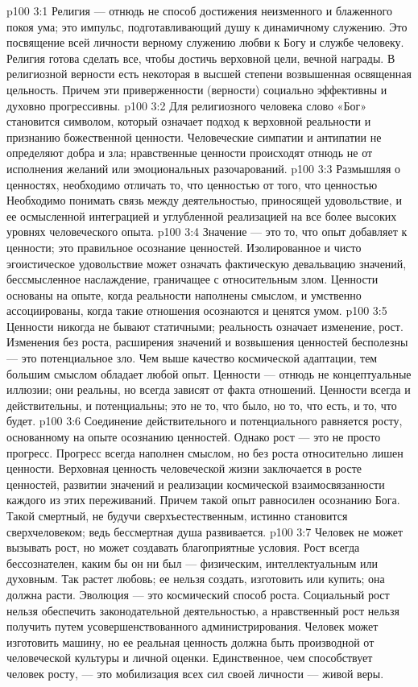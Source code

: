 \vs p100 3:1 Религия --- отнюдь не способ достижения неизменного и блаженного покоя ума; это импульс, подготавливающий душу к динамичному служению. Это посвящение всей личности верному служению любви к Богу и службе человеку. Религия готова сделать все, чтобы достичь верховной цели, вечной награды. В религиозной верности есть некоторая в высшей степени возвышенная освященная цельность. Причем эти приверженности (верности) социально эффективны и духовно прогрессивны.
\vs p100 3:2 Для религиозного человека слово «Бог» становится символом, который означает подход к верховной реальности и признанию божественной ценности. Человеческие симпатии и антипатии не определяют добра и зла; нравственные ценности происходят отнюдь не от исполнения желаний или эмоциональных разочарований.
\vs p100 3:3 Размышляя о ценностях, необходимо отличать то, что ценностью  от того, что ценностью  Необходимо понимать связь между деятельностью, приносящей удовольствие, и ее осмысленной интеграцией и углубленной реализацией на все более высоких уровнях человеческого опыта.
\vs p100 3:4 \pc Значение --- это то, что опыт добавляет к ценности; это правильное осознание ценностей. Изолированное и чисто эгоистическое удовольствие может означать фактическую девальвацию значений, бессмысленное наслаждение, граничащее с относительным злом. Ценности основаны на опыте, когда реальности наполнены смыслом, и умственно ассоциированы, когда такие отношения осознаются и ценятся умом.
\vs p100 3:5 \pc Ценности никогда не бывают статичными; реальность означает изменение, рост. Изменения без роста, расширения значений и возвышения ценностей бесполезны --- это потенциальное зло. Чем выше качество космической адаптации, тем большим смыслом обладает любой опыт. Ценности --- отнюдь не концептуальные иллюзии; они реальны, но всегда зависят от факта отношений. Ценности всегда и действительны, и потенциальны; это не то, что было, но то, что есть, и то, что будет.
\vs p100 3:6 Соединение действительного и потенциального равняется росту, основанному на опыте осознанию ценностей. Однако рост --- это не просто прогресс. Прогресс всегда наполнен смыслом, но без роста относительно лишен ценности. Верховная ценность человеческой жизни заключается в росте ценностей, развитии значений и реализации космической взаимосвязанности каждого из этих переживаний. Причем такой опыт равносилен осознанию Бога. Такой смертный, не будучи сверхъестественным, истинно становится сверхчеловеком; ведь бессмертная душа развивается.
\vs p100 3:7 Человек не может вызывать рост, но может создавать благоприятные условия. Рост всегда бессознателен, каким бы он ни был --- физическим, интеллектуальным или духовным. Так растет любовь; ее нельзя создать, изготовить или купить; она должна расти. Эволюция --- это космический способ роста. Социальный рост нельзя обеспечить законодательной деятельностью, а нравственный рост нельзя получить путем усовершенствованного администрирования. Человек может изготовить машину, но ее реальная ценность должна быть производной от человеческой культуры и личной оценки. Единственное, чем способствует человек росту, --- это мобилизация всех сил своей личности --- живой веры.
